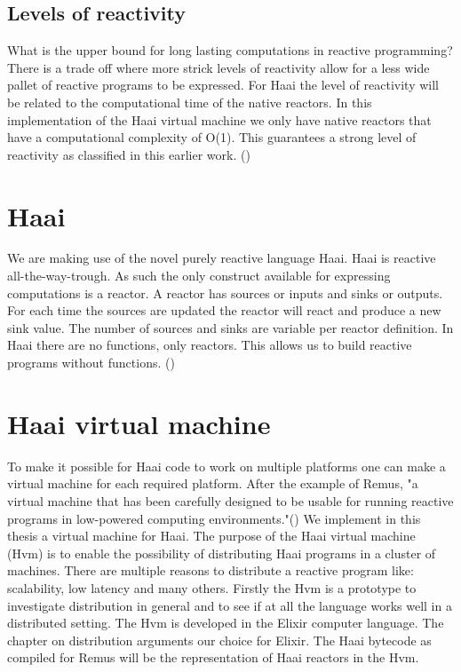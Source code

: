 \documentclass[a4paper]{book}
\begin{document}
\subsection*{Levels of reactivity}
What is the upper bound for long lasting computations in reactive programming? There is a trade off where more strick levels of reactivity allow for a less wide pallet of reactive programs to be expressed. For Haai the level of reactivity will be related to the computational time of the native reactors. In this implementation of the Haai virtual machine we only have native reactors that have a computational complexity of O(1). This guarantees a strong level of reactivity as classified in this earlier work. (\cite{vonder_tackling_2020})


\section{Haai}
We are making use of the novel purely reactive language Haai. Haai is reactive all-the-way-trough. As such the only construct available for expressing computations is a reactor. A reactor has sources or inputs and sinks or outputs. For each time the sources are updated the reactor will react and produce a new sink value. The number of sources and sinks are variable per reactor definition. In Haai there are no functions, only reactors. This allows us to build reactive programs without functions. (\cite{oeyen_reactive_2024})



\section{Haai virtual machine}
To make it possible for Haai code to work on multiple platforms one can make a virtual machine for each required platform. After the example of Remus, "a virtual machine that has been carefully designed to be usable for running reactive programs in low-powered computing environments."(\cite{oeyen_remus_2022}) We implement in this thesis a virtual machine for Haai. The purpose of the Haai virtual machine (Hvm) is to enable the possibility of distributing Haai programs in a cluster of machines. There are multiple reasons to distribute a reactive program like: scalability, low latency and many others. Firstly the Hvm is a prototype to investigate distribution in general and to see if at all the language works well in a distributed setting. The Hvm is developed  in the Elixir computer language. The chapter on distribution arguments our choice for Elixir. The Haai bytecode as compiled for Remus will be the representation of Haai reactors in the Hvm. 
\end{document}
